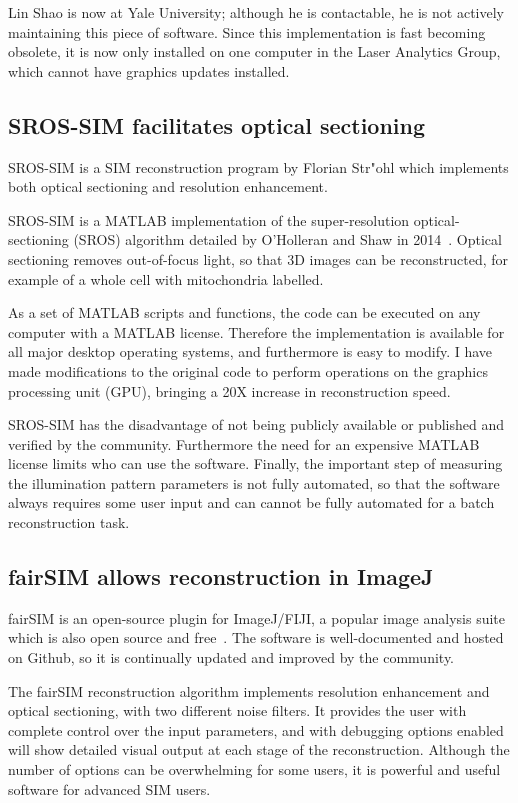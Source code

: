 Lin Shao is now at Yale University; although he is contactable, he is not actively maintaining this piece of software.
Since this implementation is fast becoming obsolete, it is now only installed on one computer in the Laser Analytics Group, which cannot have graphics updates installed. 

\subsection{SROS-SIM facilitates optical sectioning}
SROS-SIM is a SIM reconstruction program by Florian Str{"o}hl which implements both optical sectioning and resolution enhancement. 

SROS-SIM is a MATLAB implementation of the super-resolution optical-sectioning (SROS) algorithm detailed by O'Holleran and Shaw in 2014~\cite{oholleran2014optimized}. 
Optical sectioning removes out-of-focus light, so that 3D images can be reconstructed, for example of a whole cell with mitochondria labelled.

As a set of MATLAB scripts and functions, the code can be executed on any computer with a MATLAB license.
Therefore the implementation is available for all major desktop operating systems, and furthermore is easy to modify.
I have made modifications to the original code to perform operations on the graphics processing unit (GPU), bringing a 20X increase in reconstruction speed. 

SROS-SIM has the disadvantage of not being publicly available or published and verified by the community.
Furthermore the need for an expensive MATLAB license limits who can use the software. 
Finally, the important step of measuring the illumination pattern parameters is not fully automated, so that the software always requires some user input and can cannot be fully automated for a batch reconstruction task.

\subsection{fairSIM allows reconstruction in ImageJ}
fairSIM is an open-source plugin for ImageJ/FIJI, a popular image analysis suite which is also open source and free~\cite{muller2016open}. 
The software is well-documented and hosted on Github, so it is continually updated and improved by the community. 

The fairSIM reconstruction algorithm implements resolution enhancement and optical sectioning, with two different noise filters. 
It provides the user with complete control over the input parameters, and with debugging options enabled will show detailed visual output at each stage of the reconstruction. 
Although the number of options can be overwhelming for some users, it is powerful and useful software for advanced SIM users. 

